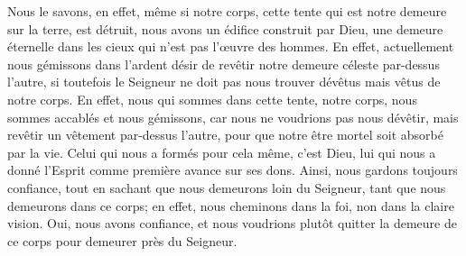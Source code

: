 Nous le savons, en effet,
	même si notre corps, cette tente qui est notre demeure sur la terre, est détruit,
	nous avons un édifice construit par Dieu,
	une demeure éternelle dans les cieux qui n’est pas l’œuvre des hommes.
En effet, actuellement nous gémissons
		dans l’ardent désir de revêtir notre demeure céleste par-dessus l’autre,
	si toutefois le Seigneur ne doit pas nous trouver dévêtus
		mais vêtus de notre corps.
En effet, nous qui sommes dans cette tente, notre corps,
	nous sommes accablés et nous gémissons, car nous ne voudrions pas nous dévêtir,
	mais revêtir un vêtement par-dessus l’autre,
	pour que notre être mortel soit absorbé par la vie.
Celui qui nous a formés pour cela même, c’est Dieu,
	lui qui nous a donné l’Esprit comme première avance sur ses dons.
Ainsi, nous gardons toujours confiance,
	tout en sachant que nous demeurons loin du Seigneur,
	tant que nous demeurons dans ce corps;
	en effet, nous cheminons dans la foi, non dans la claire vision.
Oui, nous avons confiance,
	et nous voudrions plutôt quitter la demeure de ce corps
		pour demeurer près du Seigneur.
